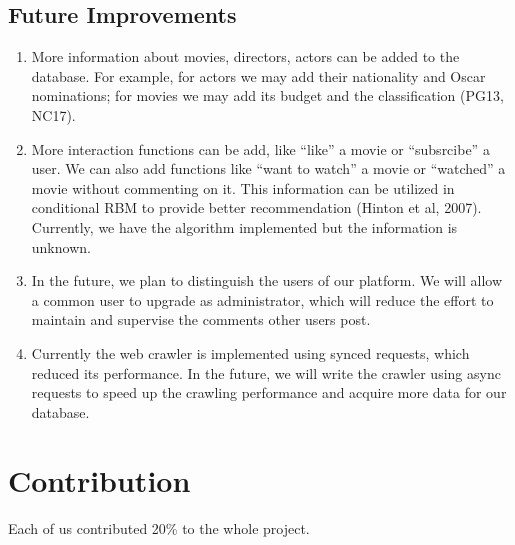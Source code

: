 \begin{CJK*}{UTF8}{gbsn}
\subsection{Future Improvements}
\begin{enumerate}
\item More information about movies, directors, actors can be added to the database. For example, for actors we may add their nationality and Oscar nominations; for movies we may add its budget and the classification (PG13, NC17).
\item More interaction functions can be add, like ``like'' a movie or ``subsrcibe'' a user. We can also add functions like ``want to watch'' a movie or ``watched'' a movie without commenting on it. This information can be utilized in conditional RBM to provide better recommendation (Hinton et al, 2007). Currently, we have the algorithm implemented but the information is unknown. 
\item In the future, we plan to distinguish the users of our platform. We will allow a common user to upgrade as administrator, which will reduce the effort to maintain and supervise the comments other users post.
\item Currently the web crawler is implemented using synced requests, which reduced its performance. In the future, we will write the crawler using async requests to speed up the crawling performance and acquire more data for our database.
\end{enumerate}

\section{Contribution}
Each of us contributed 20\% to the whole project.

\end{CJK*}

